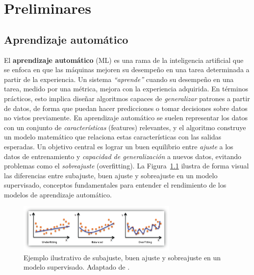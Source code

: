 \documentclass[11pt,spanish,listoffigures,listoftables]{tfgetsinf}
\begin{document}
\chapter{Preliminares}  %
\section{Aprendizaje automático}


El \textbf{aprendizaje automático} (ML) es una rama de la inteligencia artificial que se enfoca en que las máquinas mejoren 
su desempeño en una tarea determinada a partir de la experiencia. Un sistema \textit{“aprende”} cuando su desempeño en una tarea, 
medido por una métrica, mejora con la experiencia adquirida. En términos prácticos, esto implica diseñar algoritmos capaces de 
\textit{generalizar} patrones a partir de datos, de forma que puedan hacer predicciones o tomar decisiones sobre datos no vistos 
previamente. En aprendizaje automático se suelen representar los datos con un conjunto de \textit{características} (features) relevantes, y el algoritmo 
construye un modelo matemático que relaciona estas características con las salidas esperadas. Un objetivo central es lograr un buen 
equilibrio entre \textit{ajuste} a los datos de entrenamiento y \textit{capacidad de generalización} a nuevos datos, evitando problemas 
como el \textit{sobreajuste} (overfitting). La Figura~\ref{fig:overfitting} ilustra de forma visual las diferencias entre 
subajuste, buen ajuste y sobreajuste en un modelo supervisado, conceptos fundamentales para entender el rendimiento de los modelos de aprendizaje automático.

\begin{figure}[ht]
    \centering
    \includegraphics[width=0.7\textwidth]{under-overfitting.png}
    \caption{Ejemplo ilustrativo de subajuste, buen ajuste y sobreajuste en un modelo supervisado. Adaptado de \cite{awsOverfitting}.}
    \label{fig:overfitting}
\end{figure}
\end{document}
